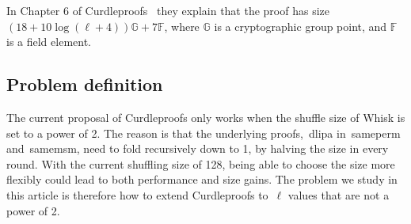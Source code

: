 In Chapter 6 of Curdleproofs~\cite{Curdleproofs} they explain that the proof has size~$(18+10 \log(\ell+4))\mathbb{G}+7\mathbb{F}$, where $\mathbb{G}$ is a cryptographic group point, and $\mathbb{F}$ is a field element.

\subsection{Problem definition}\label{subsec:problem-definition}
The current proposal of Curdleproofs only works when the shuffle size of Whisk is set to a power of 2.
The reason is that the underlying proofs,~\gls{dlipa} in~\gls{sameperm} and~\gls{samemsm}, need to fold recursively down to 1, by halving the size in every round.
With the current shuffling size of 128, being able to choose the size more flexibly could lead to both performance and size gains.
The problem we study in this article is therefore how to extend Curdleproofs to~$\ell$ values that are not a power of 2.

